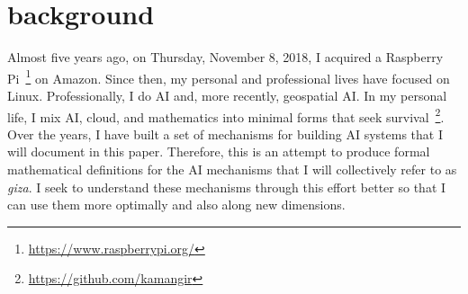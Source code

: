 \section*{background}

Almost five years ago, on Thursday, November 8, 2018, I acquired a Raspberry Pi~\footnote{\url{https://www.raspberrypi.org/}} on Amazon. Since then, my personal and professional lives have focused on Linux. Professionally, I do AI and, more recently, geospatial AI. In my personal life, I mix AI, cloud, and mathematics into minimal forms that seek survival~\footnote{\url{https://github.com/kamangir}}. Over the years, I have built a set of mechanisms for building AI systems that I will document in this paper. Therefore, this is an attempt to produce formal mathematical definitions for the AI mechanisms that I will collectively refer to as \emph{giza}. I seek to understand these mechanisms through this effort better so that I can use them more optimally and also along new dimensions.   